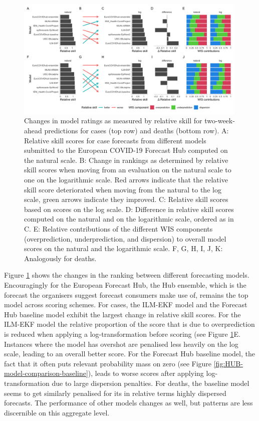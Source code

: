 \documentclass{article}
\begin{document}
\begin{figure}[h!]
    \centering
    \includegraphics[width=0.99\textwidth]{output/figures/HUB-pairwise-comparisons.png}
    \caption{Changes in model ratings as measured by relative skill for two-week-ahead predictions for cases (top row) and deaths (bottom row). A: Relative skill scores for case forecasts from different models submitted to the European COVID-19 Forecast Hub computed on the natural scale. B: Change in rankings as determined by relative skill scores when moving from an evaluation on the natural scale to one on the logarithmic scale. Red arrows indicate that the relative skill score deteriorated when moving from the natural to the log scale, green arrows indicate they improved. C: Relative skill scores based on scores on the log scale. D: Difference in relative skill scores computed on the natural and on the logarithmic scale, ordered as in C. E: Relative contributions of the different WIS components (overprediction, underprediction, and dispersion) to overall model scores on the natural and the logarithmic scale. F, G, H, I, J, K: Analogously for deaths.}
    \label{fig:HUB-rank-order}
\end{figure}

Figure \ref{fig:HUB-rank-order} shows the changes in the ranking between different forecasting models. Encouragingly for the European Forecast Hub, the Hub ensemble, which is the forecast the organisers suggest forecast consumers make use of, remains the top model across scoring schemes. For cases, the ILM-EKF model and the Forecast Hub baseline model exhibit the largest change in relative skill scores. For the ILM-EKF model the relative proportion of the score that is due to overprediction is reduced when applying a log-transformation before scoring (see Figure \ref{fig:HUB-rank-order}E. Instances where the model has overshot are penalised less heavily on the log scale, leading to an overall better score. For the Forecast Hub baseline model, the fact that it often puts relevant probability mass on zero (see Figure \ref{fig:HUB-model-comparison-baseline}), leads to worse scores after applying log-transformation due to large dispersion penalties. For deaths, the baseline model seems to get similarly penalised for its in relative terms highly dispersed forecasts. The performance of other models changes as well, but patterns are less discernible on this aggregate level. 
\end{document}
